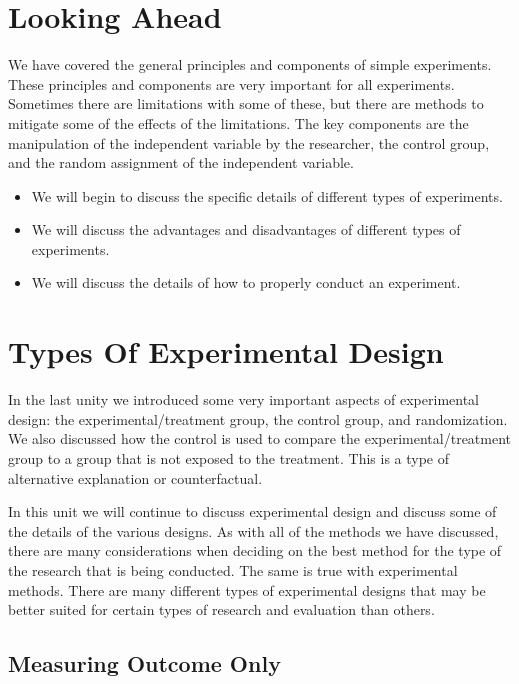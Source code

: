 \documentclass[]{book}
\theoremstyle{definition}
\theoremstyle{definition}
\theoremstyle{definition}
\theoremstyle{remark}
\begin{document}
\hypertarget{looking-ahead-10}{%
\section{Looking Ahead}\label{looking-ahead-10}}

We have covered the general principles and components of simple
experiments. These principles and components are very important for all
experiments. Sometimes there are limitations with some of these, but
there are methods to mitigate some of the effects of the limitations.
The key components are the manipulation of the independent variable by
the researcher, the control group, and the random assignment of the
independent variable.

\begin{itemize}
\item
  We will begin to discuss the specific details of different types of
  experiments.
\item
  We will discuss the advantages and disadvantages of different types of
  experiments.
\item
  We will discuss the details of how to properly conduct an experiment.
\end{itemize}

\hypertarget{types-of-experimental-design}{%
\section{Types Of Experimental
Design}\label{types-of-experimental-design}}

In the last unity we introduced some very important aspects of
experimental design: the experimental/treatment group, the control
group, and randomization. We also discussed how the control is used to
compare the experimental/treatment group to a group that is not exposed
to the treatment. This is a type of alternative explanation or
counterfactual.

In this unit we will continue to discuss experimental design and discuss
some of the details of the various designs. As with all of the methods
we have discussed, there are many considerations when deciding on the
best method for the type of the research that is being conducted. The
same is true with experimental methods. There are many different types
of experimental designs that may be better suited for certain types of
research and evaluation than others.

\hypertarget{measuring-outcome-only}{%
\subsection{Measuring Outcome Only}\label{measuring-outcome-only}}
\end{document}
